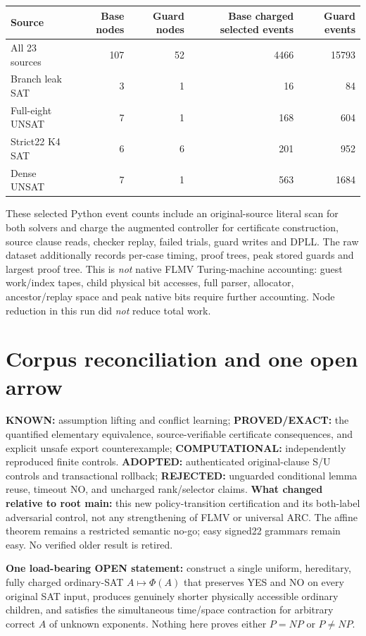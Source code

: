 \documentclass[11pt]{article}
\begin{document}
\begin{center}\begin{tabular}{lrrrr}\toprule
Source & Base nodes & Guard nodes & Base charged selected events & Guard events\\\midrule
All 23 sources & 107 & 52 & 4466 & 15793\\
Branch leak SAT & 3 & 1 & 16 & 84\\
Full-eight UNSAT & 7 & 1 & 168 & 604\\
Strict22 K4 SAT & 6 & 6 & 201 & 952\\
Dense UNSAT & 7 & 1 & 563 & 1684\\\bottomrule
\end{tabular}\end{center}
These selected Python event counts include an original-source literal scan for both solvers and charge the augmented controller for certificate construction, source clause reads, checker replay, failed trials, guard writes and DPLL. The raw dataset additionally records per-case timing, proof trees, peak stored guards and largest proof tree. This is \emph{not} native FLMV Turing-machine accounting: guest work/index tapes, child physical bit accesses, full parser, allocator, ancestor/replay space and peak native bits require further accounting. Node reduction in this run did \emph{not} reduce total work.

\section{Corpus reconciliation and one open arrow}
\textbf{KNOWN:} assumption lifting and conflict learning; \textbf{PROVED/EXACT:} the quantified elementary equivalence, source-verifiable certificate consequences, and explicit unsafe export counterexample; \textbf{COMPUTATIONAL:} independently reproduced finite controls. \textbf{ADOPTED:} authenticated original-clause S/U controls and transactional rollback; \textbf{REJECTED:} unguarded conditional lemma reuse, timeout NO, and uncharged rank/selector claims. \textbf{What changed relative to root main:} this new policy-transition certification and its both-label adversarial control, not any strengthening of FLMV or universal ARC. The affine theorem remains a restricted semantic no-go; easy signed22 grammars remain easy. No verified older result is retired.

\textbf{One load-bearing OPEN statement:} construct a single uniform, hereditary, fully charged ordinary-SAT \(A\mapsto\Phi(A)\) that preserves YES and NO on every original SAT input, produces genuinely shorter physically accessible ordinary children, and satisfies the simultaneous time/space contraction for arbitrary correct \(A\) of unknown exponents. Nothing here proves either \(P=NP\) or \(P\ne NP\).
\end{document}

